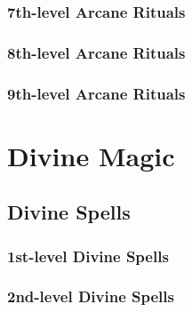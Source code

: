 \subsubsection{7th-level Arcane Rituals}
\begin{rituallist}
    \SLclone[Conj]
    \SLinstantrefuge
    \SLmagnificentmansion
    \SLteleportobject
    \SLcontrolweather[Evoc]
    \SLprogrammedimage
    \SLsequester[Illus]
    \SLsequester[Trans]
\end{rituallist}

\subsubsection{8th-level Arcane Rituals}
\begin{rituallist}
    \SLdiscernlocation
\end{rituallist}

\subsubsection{9th-level Arcane Rituals}
\begin{rituallist}
    \SLemancipation[Abjur]
    \SLantipathy[Ench]
    \SLsympathy
    \SLsoulbind[Vivi]
\end{rituallist}

\section{Divine Magic}\label{Divine Magic}

\subsection{Divine Spells}\label{Divine Spells}

\subsubsection{1st-level Divine Spells}
\begin{spelllist}
    \SLaid
    \SLbane
    \SLbless
    \SLcurewounds
    \SLdetectalignment
    \SLholdperson
    \SLinflictwounds
    \SLprotectionfromalignment
    \SLregeneration
    \SLresistenergy
    \SLresistpoison
    \SLsanctuary
    \SLsummonmonster
\end{spelllist}

\subsubsection{2nd-level Divine Spells}
\begin{spelllist}
    \SLcurseofbloodandbone
    \SLdiscernlies
    \SLdimensionalanchor
    \SLentropicshield
    \SLfreedom
    \SLmarkoftracking
    \SLplanardisruption
    \SLsharepain
    \SLsilence
\end{spelllist}

